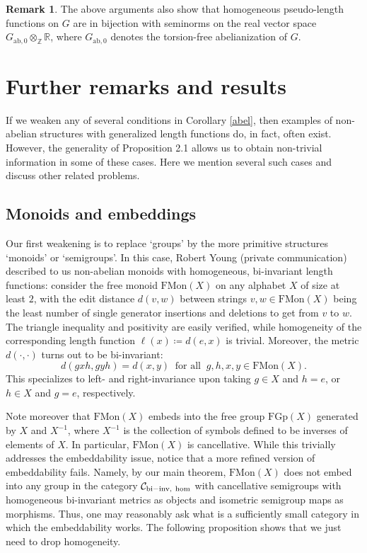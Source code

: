 \documentclass[11pt,a4paper,reqno]{amsart}
\numberwithin{equation}{section}
\theoremstyle{plain}
\theoremstyle{definition}
\newtheorem{remark}[equation]{Remark}
\newcommand\R{\mathbb{R}}
\newcommand\Z{\mathbb{Z}}
\newcommand\norm[1]{\ell({#1})}   %
\begin{document}
\begin{remark}
The above arguments also show that homogeneous pseudo-length functions on
$G$ are in bijection with seminorms on the real vector space
$G_{\mathrm{ab},0} \otimes_\Z \R$, where $G_{\mathrm{ab},0}$ denotes the
torsion-free abelianization of $G$.
\end{remark}


\section{Further remarks and results}\label{remarks-sec}

If we weaken any of several conditions in Corollary \ref{abel}, then
examples of non-abelian structures with generalized length functions do,
in fact, often exist.
However, the generality of Proposition 2.1 allows us to obtain
non-trivial information in some of these cases. Here we mention several
such cases and discuss other related problems.


\subsection{Monoids and embeddings}

Our first weakening is to replace `groups' by the more primitive
structures `monoids' or `semigroups'. In this case, Robert Young (private
communication) described to us non-abelian monoids with homogeneous,
bi-invariant length functions:
consider the free monoid $\mathrm{FMon}(X)$ on any alphabet $X$ of size
at least $2$, with the edit distance $d(v,w)$ between strings $v,w \in
\mathrm{FMon}(X)$ being the least number of single generator insertions
and deletions to get from $v$ to $w$. The triangle inequality and
positivity are easily verified, while homogeneity of the corresponding
length function $\norm{x} \coloneqq d(e,x)$ is trivial. Moreover, the
metric $d(\cdot,\cdot)$ turns out to be bi-invariant:
\[
d(gxh,gyh) = d(x,y) \ \text{ for all }\ g,h,x,y \in \mathrm{FMon}(X).
\]
This specializes to left- and right-invariance upon taking $g \in X$ and
$h = e$, or  $h \in X$ and $g = e$, respectively.

Note moreover that $\mathrm{FMon}(X)$ embeds into the free group
$\mathrm{FGp}(X)$ generated by $X$ and $X^{-1}$, where $X^{-1}$ is the
collection of symbols defined to be inverses of elements of $X$. In
particular, $\mathrm{FMon}(X)$ is cancellative. While this trivially
addresses the embeddability issue, notice that a more refined version of
embeddability fails. Namely, by our main theorem, $\mathrm{FMon}(X)$ does
not embed into any group in the category $\mathcal{C}_{\rm{bi-inv,\
hom}}$ with cancellative semigroups with homogeneous bi-invariant metrics
as objects and isometric semigroup maps as morphisms. Thus, one may
reasonably ask what is a sufficiently small category in which the
embeddability works. The following proposition shows that we just need to
drop homogeneity.
\end{document}
